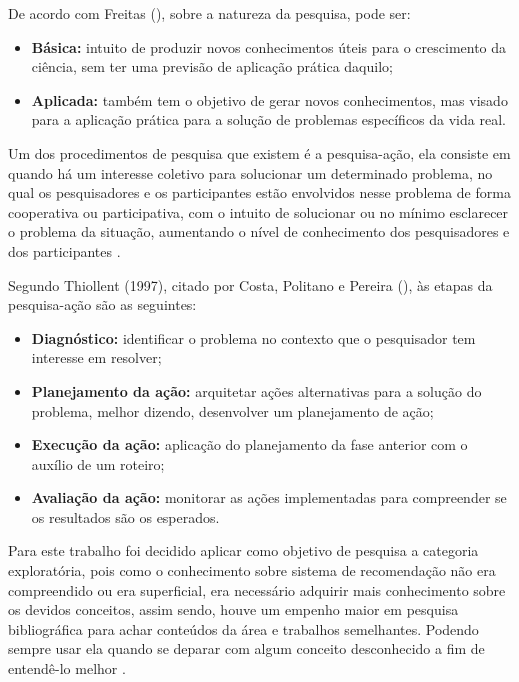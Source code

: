 De acordo com Freitas (\citeyear{de2013metodologia}), sobre a natureza da pesquisa, pode ser:

\begin{itemize}
    \item \textbf{Básica:} intuito de produzir novos conhecimentos úteis para o crescimento da ciência, sem ter uma previsão de aplicação prática daquilo;

    \item \textbf{Aplicada:} também tem o objetivo de gerar novos conhecimentos, mas visado para a aplicação prática para a solução de problemas específicos da vida real.
\end{itemize}

Um dos procedimentos de pesquisa que existem é a pesquisa-ação, ela consiste em quando há um interesse coletivo para solucionar um determinado problema, no qual os pesquisadores e os participantes estão envolvidos nesse problema de forma cooperativa ou participativa, com o intuito de solucionar ou no mínimo esclarecer o problema da situação, aumentando o nível de conhecimento dos pesquisadores e dos participantes \cite{de2013metodologia}.

Segundo Thiollent (1997), citado por Costa, Politano e Pereira (\citeyear{Costa}), às etapas da pesquisa-ação são as seguintes:

\begin{itemize}
    \item \textbf{Diagnóstico:} identificar o problema no contexto que o pesquisador tem interesse em resolver;

    \item \textbf{Planejamento da ação:} arquitetar ações alternativas para a solução do problema, melhor dizendo, desenvolver um planejamento de ação;

    \item \textbf{Execução da ação:} aplicação do planejamento da fase anterior com o auxílio de um roteiro;

    \item \textbf{Avaliação da ação:} monitorar as ações implementadas para compreender se os resultados são os esperados.
\end{itemize}

Para este trabalho foi decidido aplicar como objetivo de pesquisa a categoria exploratória, pois como o conhecimento sobre sistema de recomendação não era compreendido ou era superficial, era necessário adquirir mais conhecimento sobre os devidos conceitos, assim sendo, houve um empenho maior em pesquisa bibliográfica para achar conteúdos da área e trabalhos semelhantes. Podendo sempre usar ela quando se deparar com algum conceito desconhecido a fim de entendê-lo melhor \cite{Moretti:2018}.

